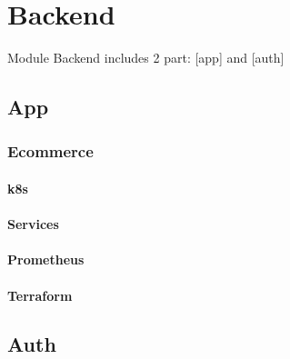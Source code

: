 \section{Backend}
Module Backend includes 2 part: [app] and [auth]
\subsection{App}
\subsubsection{Ecommerce}
\paragraph{k8s}
\paragraph{Services}
\paragraph{Prometheus}
\paragraph{Terraform}
\subsubsection{}
\subsection{Auth}

